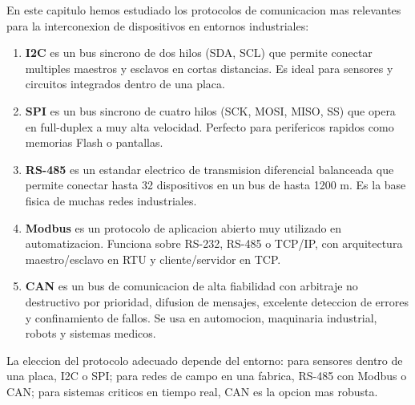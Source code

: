 En este capitulo hemos estudiado los protocolos de comunicacion mas
relevantes para la interconexion de dispositivos en entornos industriales:

\begin{enumerate}
    \item \textbf{I2C} es un bus sincrono de dos hilos (SDA, SCL) que permite
    conectar multiples maestros y esclavos en cortas distancias. Es ideal para
    sensores y circuitos integrados dentro de una placa.

    \item \textbf{SPI} es un bus sincrono de cuatro hilos (SCK, MOSI, MISO, SS)
    que opera en full-duplex a muy alta velocidad. Perfecto para perifericos
    rapidos como memorias Flash o pantallas.

    \item \textbf{RS-485} es un estandar electrico de transmision diferencial
    balanceada que permite conectar hasta 32 dispositivos en un bus de hasta
    1200 m. Es la base fisica de muchas redes industriales.

    \item \textbf{Modbus} es un protocolo de aplicacion abierto muy utilizado en
    automatizacion. Funciona sobre RS-232, RS-485 o TCP/IP, con arquitectura
    maestro/esclavo en RTU y cliente/servidor en TCP.

    \item \textbf{CAN} es un bus de comunicacion de alta fiabilidad con
    arbitraje no destructivo por prioridad, difusion de mensajes, excelente
    deteccion de errores y confinamiento de fallos. Se usa en automocion,
    maquinaria industrial, robots y sistemas medicos.
\end{enumerate}

La eleccion del protocolo adecuado depende del entorno: para sensores dentro de
una placa, I2C o SPI; para redes de campo en una fabrica, RS-485 con Modbus o
CAN; para sistemas criticos en tiempo real, CAN es la opcion mas robusta.
